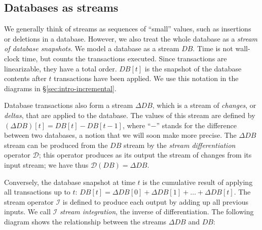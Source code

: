 \documentclass[twocolumn
]{svjour3}
\numberwithin{equation}{section}
\newcommand{\I}{\mathcal{I}}  %
\newcommand{\D}{\mathcal{D}}  %
\newcommand{\I}{\mathit{I}}  %
\newcommand{\D}{\mathit{D}}  %
\newcommand{\secref}[1]{\S\ref{#1}}  %
\newcommand{\refsec}[1]{\secref{#1}}
\newcommand{\lift}[1]{{\uparrow}#1}
\newcommand{\sv}[1]{ %
\setsepchar{ }
\readlist\arg{#1}
\setlength\tabcolsep{4pt}
\begin{tabular}{|c|c|c|c|c|} \hline
  \!\ensuremath{\cdots}\! &
  \!\ensuremath{\arg[4]}\! &
  \!\ensuremath{\arg[3]}\! &
  \!\ensuremath{\arg[2]}\! &
  \!\ensuremath{\arg[1]}\!
  \\ \hline
\end{tabular}
}
\begin{document}
\noindent
\begin{center}
\end{center}

\vspace{-3ex}

\subsection{Databases as streams}

We generally think of streams as sequences of ``small'' values, such
as insertions or deletions in a database.  However, we also treat the
whole database as a \emph{stream of database snapshots}.  We model a
database as a stream $DB$.  Time is not wall-clock time, but counts
the transactions executed.  Since transactions are linearizable, they
have a total order.  $DB[t]$ is the snapshot of the database contents
after $t$ transactions have been applied.  We use this notation in the
diagrams in \refsec{sec:intro-incremental}.

Database transactions also form a stream $\Delta DB$, which is a
stream of \emph{changes}, or \emph{deltas}, that are applied to the
database.  The values of this stream are defined by $(\Delta DB)[t] =
DB[t] - DB[t-1]$, where ``$-$'' stands for the difference between two
databases, a notion that we will soon make more precise.  The $\Delta
DB$ stream can be produced from the $DB$ stream by the \emph{stream
differentiation} operator $\D$; this operator produces as its output
the stream of changes from its input stream; we have thus $\D(DB) =
\Delta DB$.

Conversely, the database snapshot at time $t$ is the cumulative result
of applying all transactions up to $t$: $DB[t] = \Delta DB[0] + \Delta
DB[1] + \ldots + \Delta DB[t]$.  The stream operator $\I$ is defined
to produce each output by adding up all previous inputs.  We call $\I$
\emph{stream integration}, the inverse of differentiation.  The
following diagram shows the relationship between the streams $\Delta
DB$ and $DB$:
\begin{center}
\end{center}
\end{document}

